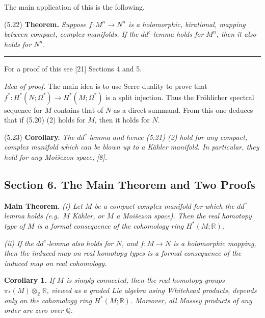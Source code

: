 \documentclass[
  english,
  a3paper,
  a3paper]{extarticle}
\begin{document}
The main application of this is the following.

(5.22) \textbf{Theorem.} \emph{Suppose \(f:M^n\longrightarrow N^n\) is a
holomorphic, birational, mapping between compact, complex manifolds. If
the \(dd^c\)-lemma holds for \(M^n\), then it also holds for \(N^n\).}

\clearpage



\par

\vspace{0.7mm}\hrule\vspace{1.6mm}

\fontsize{9}{11}\selectfont

For a proof of this see {[}21{]} Sections 4 and 5.

\emph{Idea of proof.} The main idea is to use Serre duality to prove
that \(f^*:H^*(N;\Omega^*)\longrightarrow H^*(M;\Omega^*)\) is a split
injection. Thus the Fröhlicher spectral sequence for \(M\) contains that
of \(N\) as a direct summand. From this one deduces that if (5.20) (2)
holds for \(M\), then it holds for \(N\).

(5.23) \textbf{Corollary.} \emph{The \(dd^c\)-lemma and hence (5.21) (2)
hold for any compact, complex manifold which can be blown up to a Kähler
manifold. In particular, they hold for any Moišezon space, {[}8{]}.}

\subsection{Section 6. The Main Theorem and Two
Proofs}\label{section-6.-the-main-theorem-and-two-proofs}

\textbf{Main Theorem.} \emph{(i) Let \(M\) be a compact complex manifold
for which the \(dd^c\)-lemma holds (e.g.~\(M\) Kähler, or \(M\) a
Moišezon space). Then the real homotopy type of \(M\) is a formal
consequence of the cohomology ring \(H^*(M;\mathbb R)\).}

\emph{(ii) If the \(dd^c\)-lemma also holds for \(N\), and
\(f:M\longrightarrow N\) is a holomorphic mapping, then the induced map
on real homotopy types is a formal consequence of the induced map on
real cohomology.}

\textbf{Corollary 1.} \emph{If \(M\) is simply connected, then the real
homotopy groups \(\pi_*(M)\otimes_{\mathbb Z}\mathbb R\), viewed as a
graded Lie algebra using Whitehead products, depends only on the
cohomology ring \(H^*(M;\mathbb R)\). Moreover, all Massey products of
any order are zero over \(\mathbb Q\).}
\end{document}
